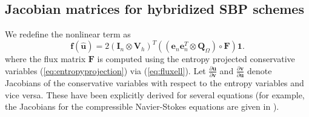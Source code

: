 \documentclass{article}
\renewcommand{\hat}{\widehat}
\newcommand{\pd}[2]{\frac{\partial#1}{\partial#2}}
\newcommand{\LRp}[1]{\left( #1 \right)}
\begin{document}
\subsection{Jacobian matrices for hybridized SBP schemes}

We redefine the nonlinear term as
\[
\bm{f}(\hat{\bm{u}}) = 2\LRp{\bm{I}_n\otimes \bm{V}_h}^T\LRp{ \LRp{\bm{e}_n\bm{e}_n^T\otimes \bm{Q}_{\Omega}} \circ \bm{F}}\bm{1}.
\]
where the flux matrix $\bm{F}$ is computed using the entropy projected conservative variables (\ref{eq:entropyprojection}) via (\ref{eq:fluxell}).
Let $\pd{\bm{u}}{\bm{v}}$ and $\pd{\bm{v}}{\bm{u}}$ denote Jacobians of the conservative variables with respect to the entropy variables and vice versa.  These have been explicitly derived for several equations (for example, the Jacobians for the compressible Navier-Stokes equations are given in \cite{hughes1986new}).  
\end{document}
